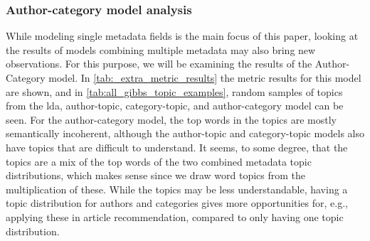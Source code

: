 \subsubsection*{Author-category model analysis}
While modeling single metadata fields is the main focus of this paper, looking at the results of models combining multiple metadata may also bring new observations.
For this purpose, we will be examining the results of the Author-Category model.
In \autoref{tab:_extra_metric_results} the metric results for this model are shown, and in \autoref{tab:all_gibbs_topic_examples}, random samples of topics from the \gls{lda}, author-topic, category-topic, and author-category model can be seen.
For the author-category model, the top words in the topics are mostly semantically incoherent, although the author-topic and category-topic models also have topics that are difficult to understand.
It seems, to some degree, that the topics are a mix of the top words of the two combined metadata topic distributions, which makes sense since we draw word topics from the multiplication of these.
While the topics may be less understandable, having a topic distribution for authors and categories gives more opportunities for, e.g., applying these in article recommendation, compared to only having one topic distribution.
